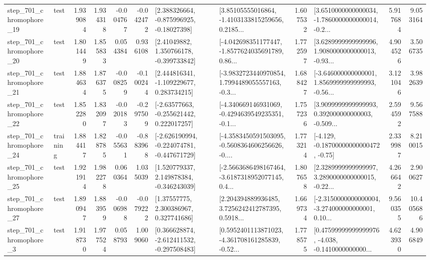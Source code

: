 \begin{tabular}{llrrrrllrlrr}
  step\_701\_chromophore\_19 &      test &      1.939084 &    1.934318 &     -0.004767 & -0.042472 &    [2.388326664, -0.875996925, -0.18027398] &  [3.85105555016864, -1.4103133815259656, 0.2185... &       1.607532 &  [3.6510000000000034, -1.7860000000000014, -0.2... &            5.917684 &          9.053164 \\
  step\_701\_chromophore\_20 &      test &      1.801449 &    1.855833 &      0.054384 &  0.936108 &     [2.41049882, 1.350766178, -0.399733842] &  [-4.042698351177447, -1.8577624035691789, 0.86... &       1.772597 &  [3.6289999999999996, 1.9080000000000013, -0.93... &            4.904526 &          3.506735 \\
  step\_701\_chromophore\_21 &      test &      1.884634 &    1.876375 &     -0.008259 & -0.100244 &    [2.444816341, -1.109229677, 0.283734215] &  [-3.9832723440970854, 1.7994489055557163, -0.3... &       1.688427 &  [-3.646000000000001, 1.8569999999999993, -0.56... &            3.121046 &          3.982639 \\
  step\_701\_chromophore\_22 &      test &      1.852280 &    1.832097 &     -0.020183 & -0.297509 &    [-2.63577663, -0.255621442, 0.222017257] &  [-4.340669146931069, -0.4294639549235351, -0.1... &       1.757236 &  [3.9099999999999993, 0.392000000000003, -0.509... &            2.594592 &          9.567588 \\
  step\_701\_chromophore\_24 &  training &      1.884417 &    1.828785 &     -0.055631 & -0.883968 &  [-2.626190994, -0.224074781, -0.447671729] &  [-4.3583450591503095, -0.5608364606256626, -0.... &       1.773214 &              [-4.129, -0.18700000000000472, -0.75] &            2.339987 &          8.210015 \\
  step\_701\_chromophore\_25 &      test &      1.921914 &    1.982278 &      0.060364 &  1.035039 &    [1.520779337, 2.149878384, -0.346243039] &  [-2.5663686498167464, -3.6187318952077145, 0.4... &       1.807658 &  [2.3289999999999997, 3.2890000000000015, -0.22... &            4.266642 &          2.900627 \\
  step\_701\_chromophore\_27 &      test &      1.890947 &    1.883959 &     -0.006988 & -0.079222 &      [1.37557775, 2.300386967, 0.327741686] &  [2.204394889936485, 3.7256242412787395, 0.5918... &       1.669734 &  [-2.3150000000000004, -3.274000000000001, 0.10... &            9.560355 &         10.405686 \\
   step\_701\_chromophore\_3 &      test &      1.918730 &    1.977524 &      0.058793 &  1.009060 &   [0.366628874, -2.612411532, -0.297508483] &  [0.5952401113871023, -4.361708161285839, -0.52... &       1.778575 &  [0.47599999999999976, -4.038, -0.1410000000000... &            4.623930 &          4.906849 \\

\end{tabular}
